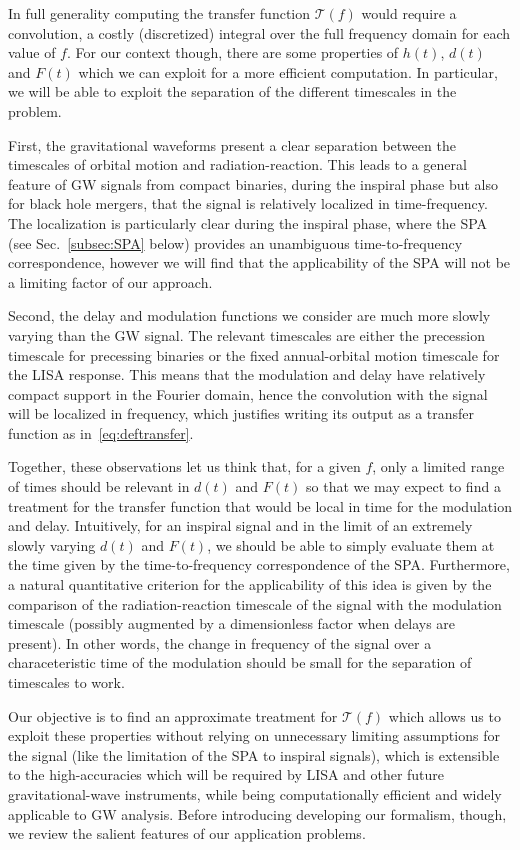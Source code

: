 \documentclass[aps,showpacs,twocolumn,
prd,superscriptaddress,nofootinbib]{revtex4-1}
\newcommand\calT{{\mathcal{T}}}
\begin{document}
In full generality computing the transfer function $\calT(f)$ would require a convolution, a costly (discretized) integral over the full frequency domain for each value of $f$. For our context though, there are some properties of $h(t)$, $d(t)$ and $F(t)$ which we can exploit for a more efficient computation. In particular, we will be able to exploit the separation of the different timescales in the problem.

First, the gravitational waveforms present a clear separation between the timescales of orbital motion and radiation-reaction. This leads to a general feature of GW signals from compact binaries, during the inspiral phase but also for black hole mergers, that the signal is relatively localized in time-frequency. The localization is particularly clear during the inspiral phase, where the SPA (see Sec.~\ref{subsec:SPA} below) provides an unambiguous time-to-frequency correspondence, however we will find that the applicability of the SPA will not be a limiting factor of our approach.

Second, the delay and modulation functions we consider are much more slowly varying than the GW signal. The relevant timescales are either the precession timescale for precessing binaries or the fixed annual-orbital motion timescale for the LISA response. This means that the modulation and delay have relatively compact support in the Fourier domain, hence the convolution with the signal will be localized in frequency, which justifies writing its output as a transfer function as in~\eqref{eq:deftransfer}.

Together, these observations let us think that, for a given $f$, only a limited range of times should be relevant in $d(t)$ and $F(t)$ so that we may expect to find a treatment for the transfer function that would be local in time for the modulation and delay. Intuitively, for an inspiral signal and in the limit of an extremely slowly varying $d(t)$ and $F(t)$, we should be able to simply evaluate them at the time given by the time-to-frequency correspondence of the SPA. Furthermore, a natural quantitative criterion for the applicability of this idea is given by the comparison of the radiation-reaction timescale of the signal with the modulation timescale (possibly augmented by a dimensionless factor when delays are present). In other words, the change in frequency of the signal over a characeteristic time of the modulation should be small for the separation of timescales to work.

Our objective is to find an approximate treatment for $\calT(f)$ which allows us to exploit these properties without relying on unnecessary limiting assumptions for the signal (like the limitation of the SPA to inspiral signals), which is extensible to the high-accuracies which will be required by LISA and other future gravitational-wave instruments, while being computationally efficient and widely applicable to GW analysis. Before introducing developing our formalism, though, we review the salient features of our application problems.
\end{document}
